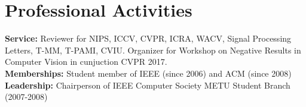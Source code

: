 \section{\mysidestyle \textcolor{olgray}{Professional Activities}}
  \textbf{Service:} Reviewer for NIPS, ICCV, CVPR, ICRA, WACV, Signal Processing Letters, T-MM, T-PAMI, CVIU. Organizer for  Workshop on Negative Results in Computer Vision in cunjuction CVPR 2017.\\
\textbf{Memberships:} Student member of IEEE (since 2006) and ACM (since 2008) \\
\textbf{Leadership:} Chairperson of IEEE Computer Society METU Student Branch (2007-2008)
